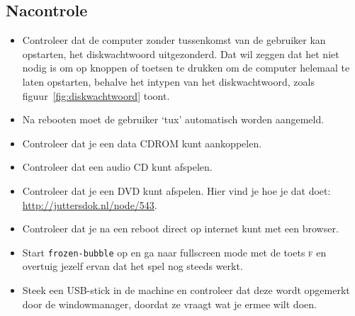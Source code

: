 \subsection{Nacontrole}
\begin{itemize}
	\item Controleer dat de computer zonder tussenkomst van de gebruiker kan opstarten, het diskwachtwoord uitgezonderd. Dat wil zeggen dat het niet nodig is om op knoppen of toetsen te drukken om de computer helemaal te laten opstarten, behalve het intypen van het diskwachtwoord, zoals figuur~\ref{fig:diskwachtwoord} toont.
	\item Na rebooten moet de gebruiker `tux' automatisch worden aangemeld.
	\item Controleer dat je een data CDROM kunt aankoppelen.
  \item Controleer dat een audio CD kunt afspelen.
  \item Controleer dat je een DVD kunt afspelen. Hier vind je hoe je dat doet:\\ \url{http://juttersdok.nl/node/543}.
	\item Controleer dat je na een reboot direct op internet kunt met een browser.
	\item Start \texttt{frozen-bubble} op en ga naar fullscreen mode met de toets \textsc{f} en overtuig jezelf ervan dat het spel nog steeds werkt.
  \item Steek een USB-stick in de machine en controleer dat deze wordt opgemerkt door de windowmanager, doordat ze vraagt wat je ermee wilt doen.
\end{itemize}
